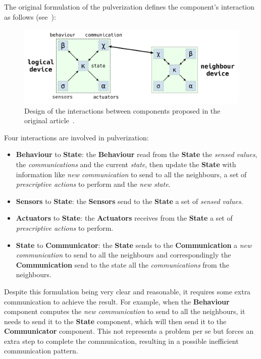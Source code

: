 The original formulation of the pulverization defines the component's interaction as follows (see~):

\begin{figure}
	\centering
	\includegraphics[width=\textwidth]{figures/original-components-interactions.pdf}
	\caption{Design of the interactions between components proposed in the original article~\cite{fi12110203}.}
	\label{fig:framework-components-interaction}
\end{figure}

Four interactions are involved in pulverization:
\begin{itemize}
	\item \textbf{Behaviour} to \textbf{State}: the \textbf{Behaviour} read from the \textbf{State} the \textit{sensed values}, the \textit
	      {communications} and the current \textit{state}, then update the \textbf{State} with information like \textit{new communication} to send to
	      all the neighbours, a set of \textit{prescriptive actions} to perform and the \textit{new state}.
	\item \textbf{Sensors} to \textbf{State}: the \textbf{Sensors} send to the \textbf{State} a set of \textit{sensed values}.
	\item \textbf{Actuators} to \textbf{State}: the \textbf{Actuators} receives from the \textbf{State} a set of \textit{prescriptive actions} to
	      perform.
	\item \textbf{State} to \textbf{Communicator}: the \textbf{State} sends to the \textbf{Communication} a \textit{new communication}
	      to send to all the neighbours and correspondingly the \textbf{Communication} send to the state all the \textit{communications} from the
	      neighbours.
\end{itemize}


Despite this formulation being very clear and reasonable, it requires some extra communication to achieve the result.
For example, when the \textbf{Behaviour} component computes the \textit{new communication} to send to all the neighbours, it needs to send it to the
\textbf{State} component, which will then send it to the \textbf{Communicator} component. This not represents a problem per se but forces an extra
step to complete the communication, resulting in a possible inefficient communication pattern.

